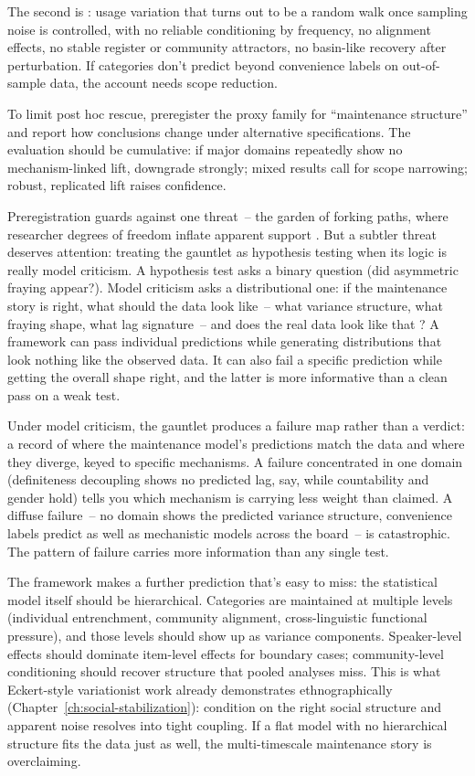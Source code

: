 The second is : usage variation that turns out to be a random walk once sampling noise is controlled, with no reliable conditioning by frequency, no alignment effects, no stable register or community attractors, no basin-like recovery after perturbation. If categories don't predict beyond convenience labels on out-of-sample data, the account needs scope reduction.

To limit post hoc rescue, preregister the proxy family for \enquote{maintenance structure} and report how conclusions change under alternative specifications. The evaluation should be cumulative: if major domains repeatedly show no mechanism-linked lift, downgrade strongly; mixed results call for scope narrowing; robust, replicated lift raises confidence.

Preregistration guards against one threat~-- the garden of forking paths, where researcher degrees of freedom inflate apparent support \citep{GelmanLoken2013}. But a subtler threat deserves attention: treating the gauntlet as hypothesis testing when its logic is really model criticism. A hypothesis test asks a binary question (did asymmetric fraying appear?). Model criticism asks a distributional one: if the maintenance story is right, what should the data look like~-- what variance structure, what fraying shape, what lag signature~-- and does the real data look like that \citep[ch.~6]{GelmanBDA3}? A framework can pass individual predictions while generating distributions that look nothing like the observed data. It can also fail a specific prediction while getting the overall shape right, and the latter is more informative than a clean pass on a weak test.

Under model criticism, the gauntlet produces a failure map rather than a verdict: a record of where the maintenance model's predictions match the data and where they diverge, keyed to specific mechanisms. A failure concentrated in one domain (definiteness decoupling shows no predicted lag, say, while countability and gender hold) tells you which mechanism is carrying less weight than claimed. A diffuse failure~-- no domain shows the predicted variance structure, convenience labels predict as well as mechanistic models across the board~-- is catastrophic. The pattern of failure carries more information than any single test.

The framework makes a further prediction that's easy to miss: the statistical model itself should be hierarchical. Categories are maintained at multiple levels (individual entrenchment, community alignment, cross-linguistic functional pressure), and those levels should show up as variance components. Speaker-level effects should dominate item-level effects for boundary cases; community-level conditioning should recover structure that pooled analyses miss. This is what Eckert-style variationist work already demonstrates ethnographically (Chapter~\ref{ch:social-stabilization}): condition on the right social structure and apparent noise resolves into tight coupling. If a flat model with no hierarchical structure fits the data just as well, the multi-timescale maintenance story is overclaiming.

